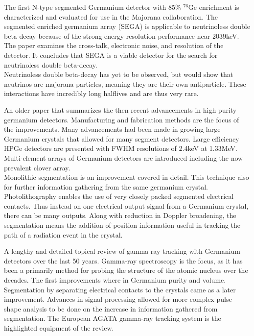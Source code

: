 \documentclass[12pt]{article}
\begin{document}
\begin{doublespacing}
{\large\textbf{\cite{Leviner201466}}}
The first N-type segmented Germanium detector with 85\% $^{76}\mbox{Ge}$ enrichment is characterized and evaluated for use in the Majorana collaboration.
The segmented enriched germanium array (SEGA) is applicable to neutrinoless double beta-decay because of the strong energy resolution performance near 2039keV.
The paper examines the cross-talk, electronic noise, and resolution of the detector.
It concludes that SEGA is a viable detector for the search for neutrinoless double beta-decay.
\\

Neutrinoless double beta-decay has yet to be observed, but would show that neutrinos are majorana particles, meaning they are their own antiparticle.
These interactions have incredibly long halflives and are thus very rare.


{\large\textbf{\cite{Sangsingkeow2003183}}}
An older paper that summarizes the then recent advancements in high purity germanium detectors.
Manufacturing and fabrication methods are the focus of the improvements.
Many advancements had been made in growing large Germanium crystals that allowed for many segment detectors.
Large efficiency HPGe detectors are presented with FWHM resolutions of 2.4keV at 1.33MeV.
Multi-element arrays of Germanium detectors are introduced including the now prevalent clover array.
\\

Monolithic segmentation is an improvement covered in detail.
This technique also for further information gathering from the same germanium crystal.
Photolithography enables the use of very closely packed segmented electrical contacts.
Thus instead on one electrical output signal from a Germanium crystal, there can be many outputs.
Along with reduction in Doppler broadening, the segmentation means the addition of position information useful in tracking the path of a radiation event in the crystal.


{\large\textbf{\cite{Eberth2008283}}}
A lengthy and detailed topical review of gamma-ray tracking with Germanium detectors over the last 50 years.
Gamma-ray spectroscopy is the focus, as it has been a primarily method for probing the structure of the atomic nucleus over the decades.
The first improvements where in Germanium purity and volume.
Segmentation by separating electrical contacts to the crystals came as a later improvement.
Advances in signal processing allowed for more complex pulse shape analysis to be done on the increase in information gathered from segmentation.
The European AGATA gamma-ray tracking system is the highlighted equipment of the review.
\\


\end{doublespacing}
\end{document}
